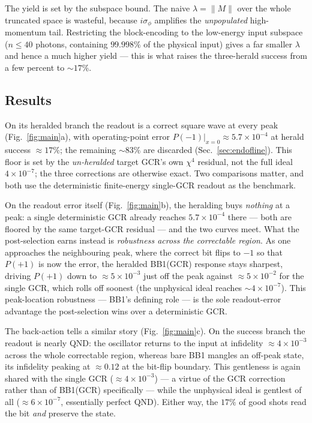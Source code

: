 \documentclass[11pt]{article}
\begin{document}
The yield is set by the subspace bound. The naive $\lambda=\|M\|$ over the whole truncated space
is wasteful, because $i\sigma_\phi$ amplifies the \emph{unpopulated} high-momentum tail. Restricting
the block-encoding to the low-energy input subspace ($n\le 40$ photons, containing $99.998\%$ of the
physical input) gives a far smaller $\lambda$ and hence a much higher yield --- this is what raises
the three-herald success from a few percent to $\sim17\%$.

\subsection{Results}
On its heralded branch the readout is a correct square wave at every peak (Fig.~\ref{fig:main}a),
with operating-point error $P(-1)|_{x=0}\approx5.7\times10^{-4}$ at herald success $\approx17\%$; the
remaining $\sim83\%$ are discarded (Sec.~\ref{sec:endofline}). This floor is set by the
\emph{un-heralded} target GCR's own $\chi^4$ residual, not the full ideal $4\times10^{-7}$; the three
corrections are otherwise exact. Two comparisons matter, and both use the deterministic
finite-energy single-GCR readout as the benchmark.

On the readout error itself (Fig.~\ref{fig:main}b), the heralding buys \emph{nothing} at a peak: a
single deterministic GCR already reaches $5.7\times10^{-4}$ there --- both are floored by the same
target-GCR residual --- and the two curves meet. What the post-selection earns instead is
\emph{robustness across the correctable region}. As one approaches the neighbouring peak, where the
correct bit flips to $-1$ so that $P(+1)$ is now the error, the heralded BB1(GCR) response stays
sharpest, driving $P(+1)$ down to $\approx5\times10^{-3}$ just off the peak against
$\approx5\times10^{-2}$ for the single GCR, which rolls off soonest (the unphysical ideal reaches
$\sim4\times10^{-7}$). This peak-location robustness --- BB1's defining role --- is the sole
readout-error advantage the post-selection wins over a deterministic GCR.

The back-action tells a similar story (Fig.~\ref{fig:main}c). On the success branch the readout is
nearly QND: the oscillator returns to the input at infidelity $\approx4\times10^{-3}$ across the whole
correctable region, whereas bare BB1 mangles an off-peak state, its infidelity peaking at
$\approx0.12$ at the bit-flip boundary. This gentleness is again shared with the single GCR
($\approx4\times10^{-3}$) --- a virtue of the GCR correction rather than of BB1(GCR) specifically ---
while the unphysical ideal is gentlest of all ($\approx6\times10^{-7}$, essentially perfect QND).
Either way, the $17\%$ of good shots read the bit \emph{and} preserve the state.
\end{document}
